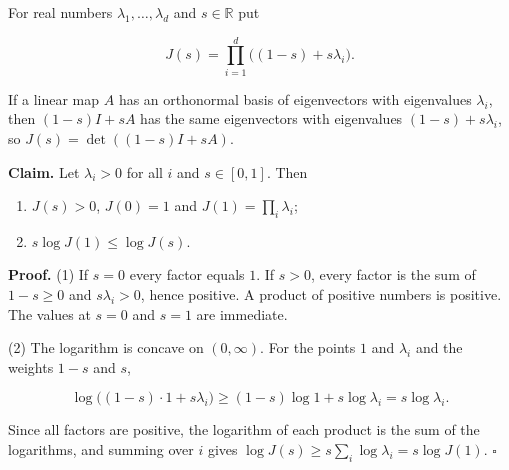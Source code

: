 \documentclass[11pt,a4paper]{report}
\begin{document}
For real numbers \(\lambda_1,\dots,\lambda_d\) and \(s\in\mathbb R\) put


\[J(s)=\prod_{i=1}^d\bigl((1-s)+s\lambda_i\bigr).\]


If a linear map \(A\) has an orthonormal basis of eigenvectors with eigenvalues \(\lambda_i\), then \((1-s)I+sA\) has the same eigenvectors with eigenvalues \((1-s)+s\lambda_i\), so \(J(s)=\det((1-s)I+sA)\).




\textbf{Claim.} Let \(\lambda_i>0\) for all \(i\) and \(s\in[0,1]\). Then



\begin{enumerate}


\item \(J(s)>0\), \(J(0)=1\) and \(J(1)=\prod_i\lambda_i\);

\item \(s\log J(1)\le\log J(s)\).

\end{enumerate}



\textbf{Proof.} (1) If \(s=0\) every factor equals \(1\). If \(s>0\), every factor is the sum of \(1-s\ge0\) and \(s\lambda_i>0\), hence positive. A product of positive numbers is positive. The values at \(s=0\) and \(s=1\) are immediate.




(2) The logarithm is concave on \((0,\infty)\). For the points \(1\) and \(\lambda_i\) and the weights \(1-s\) and \(s\),


\[\log\bigl((1-s)\cdot1+s\lambda_i\bigr)\ge(1-s)\log1+s\log\lambda_i=s\log\lambda_i.\]


Since all factors are positive, the logarithm of each product is the sum of the logarithms, and summing over \(i\) gives \(\log J(s)\ge s\sum_i\log\lambda_i=s\log J(1)\). \(\square\)
\end{document}
